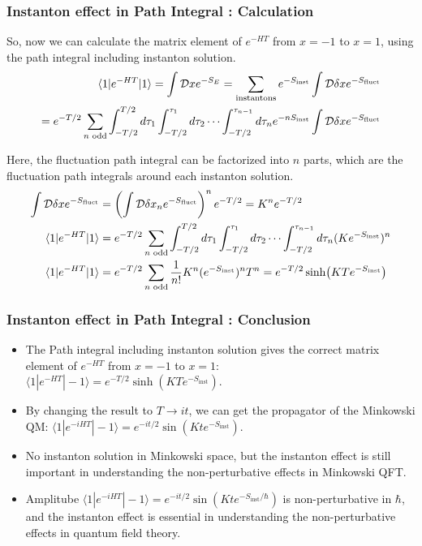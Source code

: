 \documentclass[10pt]{beamer}
\begin{document}
\begin{frame}
    \frametitle{Instanton effect in Path Integral : Calculation}

    So, now we can calculate the matrix element of $e^{-HT}$ from $x = -1$ to $x = 1$, using the path integral including instanton solution.
    \begin{align*}
    \small
    \langle 1 | e^{-HT} | 1 \rangle = \int \mathcal{D}x e^{-S_E} = \sum_{\text{instantons}} e^{-S_{\text{inst}}} \int \mathcal{D}\delta x e^{-S_{\text{fluct}}} \\
    = e^{-T/2} \sum_{n \text{ odd}} \int_{-T/2}^{T/2} d\tau_1 \int_{-T/2}^{\tau_1} d\tau_2 \cdots \int_{-T/2}^{\tau_{n-1}} d\tau_n e^{-nS_{\text{inst}}} \int \mathcal{D}\delta x e^{-S_{\text{fluct}}} 
    \end{align*}


Here, the fluctuation path integral can be factorized into $n$ parts, which are the fluctuation path integrals around each instanton solution.
\begin{align*}
\small
\int \mathcal{D}\delta x e^{-S_{\text{fluct}}} &= \left(\int \mathcal{D}\delta x_n e^{-S_{\text{fluct}}}\right)^n e^{-T/2}= K^n e^{-T/2} \\
    \langle 1 | e^{-HT} | 1 \rangle &= e^{-T/2} \sum_{n \text{ odd}} \int_{-T/2}^{T/2} d\tau_1 \int_{-T/2}^{\tau_1} d\tau_2 \cdots \int_{-T/2}^{\tau_{n-1}} d\tau_n (Ke^{-S_{\text{inst}}})^n \\
    \langle 1 | e^{-HT} | 1 \rangle &=e^{-T/2} \sum_{n \text{ odd}} \frac{1}{n!} K^n(e^{-S_{\text{inst}}})^n T^n = e^{-T/2} \sinh(KTe^{-S_{\text{inst}}}) \\
\end{align*}
\end{frame}

\begin{frame}
\frametitle{Instanton effect in Path Integral : Conclusion}
\begin{itemize}
\item The Path integral including instanton solution gives the correct matrix element of $e^{-HT}$ from $x = -1$ to $x = 1$: $\langle 1 | e^{-HT} | -1 \rangle = e^{-T/2} \sinh(KTe^{-S_{\text{inst}}})$.
\item By changing the result to $T \rightarrow it$, we can get the propagator of the Minkowski QM: $\langle 1 | e^{-iHT} | -1 \rangle = e^{-it/2} \sin(Kte^{-S_{\text{inst}}})$.
\item No instanton solution in Minkowski space, but the instanton effect is still important in understanding the non-perturbative effects in Minkowski QFT.
\item Amplitube $\langle 1 | e^{-iHT} | -1 \rangle = e^{-it/2} \sin(Kte^{-S_{\text{inst}}/\hbar})$ is non-perturbative in $\hbar$, and the instanton effect is essential in understanding the non-perturbative effects in quantum field theory.
\end{itemize}
\end{frame}
\end{document}
